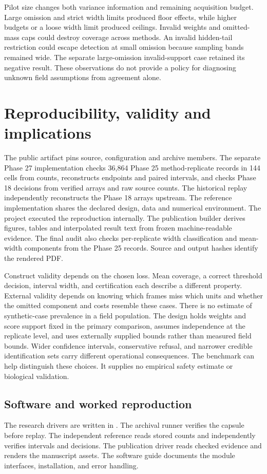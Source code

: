 \documentclass[article,nojss]{jss}
\begin{document}
Pilot size changes both variance information and remaining acquisition
budget. Large omission and strict width limits produced floor effects,
while higher budgets or a loose width limit produced ceilings. Invalid
weights and omitted-mass caps could destroy coverage across methods. An
invalid hidden-tail restriction could escape detection at small omission
because sampling bands remained wide. The separate large-omission
invalid-support case retained its negative result. These observations do
not provide a policy for diagnosing unknown field assumptions from
agreement alone.

\section{Reproducibility, validity and implications}

The public artifact pins source, configuration and archive members. The
separate Phase 27 implementation checks 36,864 Phase 25 method-replicate
records in 144 cells from counts, reconstructs endpoints and paired
intervals, and checks Phase 18 decisions from verified arrays and raw
source counts. The historical replay independently reconstructs the
Phase 18 arrays upstream. The reference implementation shares the
declared design, data and numerical environment. The project executed
the reproduction internally. The publication builder derives figures,
tables and interpolated result text from frozen machine-readable
evidence. The final audit also checks per-replicate width classification
and mean-width components from the Phase 25 records. Source and output
hashes identify the rendered PDF.

Construct validity depends on the chosen loss. Mean coverage, a correct
threshold decision, interval width, and certification each describe a
different property. External validity depends on knowing which frames
miss which units and whether the omitted component and costs resemble
these cases. There is no estimate of synthetic-case prevalence in a
field population. The design holds weights and score support fixed in
the primary comparison, assumes independence at the replicate level, and
uses externally supplied bounds rather than measured field bounds. Wider
confidence intervals, conservative refusal, and narrower credible
identification sets carry different operational consequences. The
benchmark can help distinguish these choices. It supplies no empirical
safety estimate or biological validation.

\subsection{Software and worked reproduction}
The  research drivers are written in . The archival
runner verifies the capsule before replay. The independent reference reads
stored counts and independently verifies intervals and decisions. The publication
driver reads checked evidence and renders the manuscript assets. The software
guide documents the module interfaces, installation, and error handling.
\end{document}
